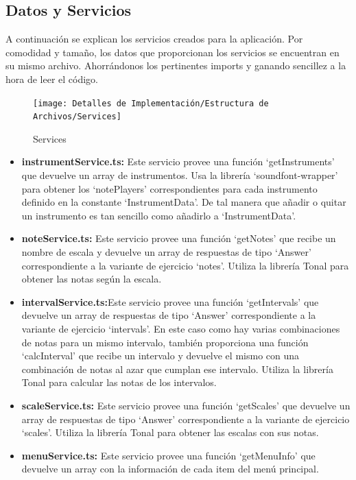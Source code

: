 \documentclass[12pt,twoside,titlepage]{report}
\begin{document}
\subsection{Datos y Servicios}
A continuación se explican los servicios creados para la aplicación. Por comodidad y tamaño, los datos que proporcionan los servicios se encuentran en su mismo archivo. Ahorrándonos los pertinentes imports y ganando sencillez a la hora de leer el código.

\begin{figure}[H]
    \centering
    \texttt{[image: Detalles de Implementación/Estructura de Archivos/Services]}
    \label{fig:Services}
    \caption{Services}
\end{figure}

\begin{itemize}
    \item \textbf{instrumentService.ts:} Este servicio provee una función ‘getInstruments’ que devuelve un array de instrumentos. Usa la librería ‘soundfont-wrapper’ para obtener los ‘notePlayers’ correspondientes para cada instrumento definido en la constante ‘InstrumentData’. De tal manera que añadir o quitar un instrumento es tan sencillo como añadirlo a ‘InstrumentData’.
    \item \textbf{noteService.ts:} Este servicio provee una función ‘getNotes’ que recibe un nombre de escala y devuelve un array de respuestas de tipo ‘Answer’ correspondiente a la variante de ejercicio ‘notes’. Utiliza la librería Tonal para obtener las notas según la escala.
    \item \textbf{intervalService.ts:}Este servicio provee una función ‘getIntervals’ que devuelve un array de respuestas de tipo ‘Answer’ correspondiente a la  variante de ejercicio ‘intervals’. En este caso como hay varias combinaciones de notas para un mismo intervalo, también proporciona una función ‘calcInterval’ que recibe un intervalo y devuelve el mismo con una combinación de notas al azar que cumplan ese intervalo. Utiliza la librería Tonal para calcular las notas de los intervalos.
    \item \textbf{scaleService.ts:} Este servicio provee una función ‘getScales’ que devuelve un array de respuestas de tipo ‘Answer’ correspondiente a la  variante de ejercicio ‘scales’. Utiliza la librería Tonal para obtener las escalas con sus notas.
    \item \textbf{menuService.ts:} Este servicio provee una función ‘getMenuInfo’ que devuelve un array con la información de cada item del menú principal. 
\end{itemize}
\end{document}
